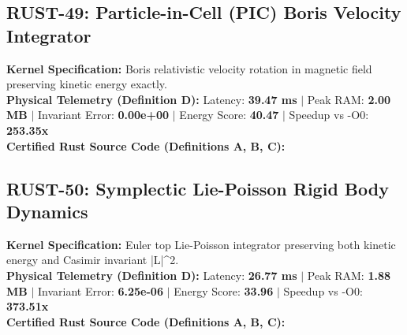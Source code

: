 \vspace{1em}
\subsection{RUST-49: Particle-in-Cell (PIC) Boris Velocity Integrator}
\textbf{Kernel Specification:} Boris relativistic velocity rotation in magnetic field preserving kinetic energy exactly.\\
\textbf{Physical Telemetry (Definition D):} Latency: \textbf{39.47 ms} $|$ Peak RAM: \textbf{2.00 MB} $|$ Invariant Error: \textbf{0.00e+00} $|$ Energy Score: \textbf{40.47} $|$ Speedup vs -O0: \textbf{253.35x}\\

\textbf{Certified Rust Source Code (Definitions A, B, C):}


\vspace{1em}
\subsection{RUST-50: Symplectic Lie-Poisson Rigid Body Dynamics}
\textbf{Kernel Specification:} Euler top Lie-Poisson integrator preserving both kinetic energy and Casimir invariant |L|\textasciicircum{}2.\\
\textbf{Physical Telemetry (Definition D):} Latency: \textbf{26.77 ms} $|$ Peak RAM: \textbf{1.88 MB} $|$ Invariant Error: \textbf{6.25e-06} $|$ Energy Score: \textbf{33.96} $|$ Speedup vs -O0: \textbf{373.51x}\\

\textbf{Certified Rust Source Code (Definitions A, B, C):}


\vspace{1em}
\newpage
